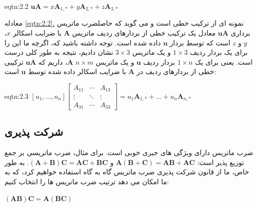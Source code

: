 {\begin{spacing}{1.5}
        \begin{eqtn}{eqtn:2.2}
            \centering
            $\textbf{uA}=x\textbf{A}_{1,*}+y\textbf{A}_{2,*}+z\textbf{A}_{3,*}$
        \end{eqtn}

        معادله \hyperref[eqtn:2.2]{\ref{eqtn:2.2}.} نمونه ای از ترکیب خطی است و
        می گوید که حاصلضرب ماتریس برداری $\textbf{uA}$ معادل یک ترکیب خطی از بردارهای ردیف ماتریس $\textbf{A}$ با ضرایب اسکالر $x$، $y$ و $z$ است که توسط بردار $\textbf{u}$ داده شده است.
        توجه داشته باشید که، اگرچه ما این را برای یک بردار ردیف $1\times 3$ و یک ماتریس $3\times 3$ نشان دادیم، نتیجه به طور کلی درست است.
        یعنی برای یک $1\times n$ بردار ردیف $\textbf{u}$ و یک ماتریس $n\times m$ $\textbf{A}$، داریم که $\textbf{uA}$ ترکیبی خطی از بردارهای ردیف در $\textbf{A}$ با ضرایب اسکالر داده شده توسط $\textbf{u}$ است:

        \begin{eqtn}{eqtn:2.3}
            \centering
            $[u_{1},\dots,u_{n}]\begin{bmatrix}
                                    A_{11} & \cdots & A_{13} \\
                                    \vdots & \ddots & \vdots \\
                                    A_{31} & \cdots & A_{33}
            \end{bmatrix}=u_{1}\textbf{A}_{1,*}+\dots+u_{n}\textbf{A}_{n,*}$
        \end{eqtn}
    \end{spacing}
}

\subsection{\textbf{شرکت پذیری}}
{
    \Large
    \begin{spacing}{1.5}
        ضرب ماتریس دارای ویژگی های جبری خوبی است. برای مثال، ضرب ماتریسی بر جمع توزیع پذیر است: $\textbf{A}(\textbf{B}+\textbf{C})=\textbf{AB}+\textbf{AC}$ و $(\textbf{A}+\textbf{B})\textbf{C}=\textbf{AC}+\textbf{BC}$.
        به طور خاص، ما از قانون شرکت پذیری ضرب ماتریس گاه به گاه استفاده خواهیم کرد، که به ما امکان می دهد ترتیب ضرب ماتریس ها را انتخاب کنیم:

        \begin{center}
            $(\textbf{AB})\textbf{C}=\textbf{A}(\textbf{BC})$
        \end{center}

    \end{spacing}
}


